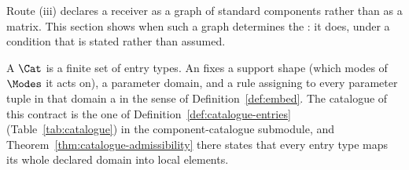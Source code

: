 
Route (iii) declares a receiver as a graph of standard components rather than
as a matrix. This section shows when such a graph determines the
: it does, under a condition that is stated rather
than assumed.

\begin{definition}\label{def:catalogue}
A  $\Cat$ is a finite set of entry types. An
 fixes a support shape (which modes of $\Modes$ it acts on), a
parameter domain, and a rule assigning to every parameter tuple in that domain
a  in the sense of Definition~\ref{def:embed}. The
catalogue of this contract is the one of Definition~\ref{def:catalogue-entries}
(Table~\ref{tab:catalogue}) in the component-catalogue submodule, and
Theorem~\ref{thm:catalogue-admissibility} there states that every entry type maps its whole
declared domain into local elements.
\end{definition}

